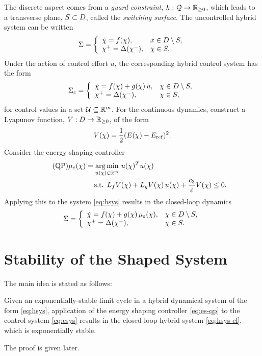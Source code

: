 \documentclass[twocolumn]{article}
\begin{document}
The discrete aspect comes from a {\em guard constraint}, $h : \mathcal{Q} \to \mathbb{R}_{\geq 0}$, which leads to a transverse plane, $S \subset D$, called the {\em switching surface}.
%
The uncontrolled hybrid system can be written
\begin{align}
  \Sigma = \left\{
  \begin{array}{l l}
    {\dot {\chi}} = f(\chi), & x \in D \setminus S,\\
    \chi^{+} = \Delta(\chi^{-}), &\chi \in S,
  \end{array}\right.
  \label{eq:hsys}
\end{align}
Under the action of control effort $u$, the corresponding hybrid control system has the form
\begin{align}
  \Sigma_{c} = \left\{
  \begin{array}{l l}
    {\dot {\chi}} = f(\chi) + g(\chi) \, u, & \chi \in D \setminus S,\\
    \chi^{+} = \Delta(\chi^{-}), & \chi \in S,
  \end{array}\right.
  \label{eq:csys}
\end{align}
for control values in a set $\mathcal{U} \subseteq \mathbb{R}^{m}$.
%
For the continuous dynamics, construct a Lyapunov function, $V : D \to \mathbb{R}_{\geq 0}$, of the form
\begin{align}
  \label{eq:lyap}
  V(\chi) = \frac{1}{2} (E(\chi) - E_{\mathrm{ref}})^2.
\end{align}
Consider the energy shaping controller
\begin{align}
  \label{eq:es-qp} \tag {QP}
  \mu_{\varepsilon}(\chi) = \operatorname*{arg\,min}_{u(\chi) \in \mathbb{R}^{m}} \ & u(\chi)^T u(\chi)\\
  \nonumber
  \mbox{s.t. } L_{f} V&(\chi) + L_{g} V(\chi) \, u(\chi) + \frac{c_{3}}{\varepsilon} V(\chi) \leq 0.
\end{align}
Applying this to the system \eqref{eq:hsys} results in the closed-loop dynamics
\begin{align}
  \label{eq:hsys-cl}
  \Sigma = \left\{
  \begin{array}{l l}
    {\dot {\chi}} = f(\chi) + g(\chi) \, \mu_{\varepsilon}(\chi), & \chi \in D \setminus S,\\
    \chi^{+} = \Delta(\chi^{-}), &\chi \in S.
  \end{array}\right.
\end{align}

\section{Stability of the Shaped System}

The main idea is stated as follows:
%
\begin{theorem}
  Given an exponentially-stable limit cycle in a hybrid dynamical system of the form \eqref{eq:hsys}, application of the energy shaping controller \eqref{eq:es-qp} to the control system \eqref{eq:csys} results in the closed-loop hybrid system \eqref{eq:hsys-cl}, which is exponentially stable.
\end{theorem}
%
The proof is given later.
\end{document}
